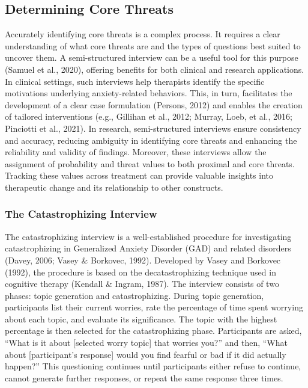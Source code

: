 \documentclass[
  man,floatsintext]{apa7}
\begin{document}
\subsection{Determining Core Threats}\label{determining-core-threats}

Accurately identifying core threats is a complex process.
It requires a clear understanding of what core threats are and the types of questions best suited to uncover them.
A semi-structured interview can be a useful tool for this purpose (Samuel et al., 2020), offering benefits for both clinical and research applications.
In clinical settings, such interviews help therapists identify the specific motivations underlying anxiety-related behaviors.
This, in turn, facilitates the development of a clear case formulation (Persons, 2012) and enables the creation of tailored interventions (e.g., Gillihan et al., 2012; Murray, Loeb, et al., 2016; Pinciotti et al., 2021).
In research, semi-structured interviews ensure consistency and accuracy, reducing ambiguity in identifying core threats and enhancing the reliability and validity of findings.
Moreover, these interviews allow the assignment of probability and threat values to both proximal and core threats.
Tracking these values across treatment can provide valuable insights into therapeutic change and its relationship to other constructs.

\subsubsection{The Catastrophizing Interview}\label{the-catastrophizing-interview}

The catastrophizing interview is a well-established procedure for investigating catastrophizing in Generalized Anxiety Disorder (GAD) and related disorders (Davey, 2006; Vasey \& Borkovec, 1992).
Developed by Vasey and Borkovec (1992), the procedure is based on the decatastrophizing technique used in cognitive therapy (Kendall \& Ingram, 1987).
The interview consists of two phases: topic generation and catastrophizing.
During topic generation, participants list their current worries, rate the percentage of time spent worrying about each topic, and evaluate its significance.
The topic with the highest percentage is then selected for the catastrophizing phase.
Participants are asked, ``What is it about {[}selected worry topic{]} that worries you?'' and then, ``What about {[}participant's response{]} would you find fearful or bad if it did actually happen?'' This questioning continues until participants either refuse to continue, cannot generate further responses, or repeat the same response three times.
\end{document}
